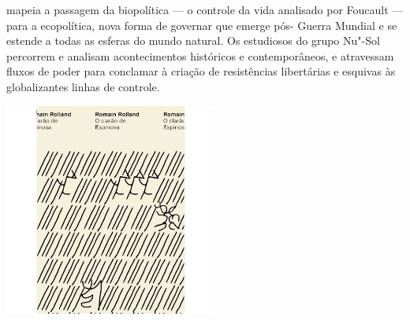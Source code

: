 \hspace*{-7cm}\hrulefill\hspace*{-7cm}

\medskip

 mapeia a passagem da biopolítica — o controle da vida analisado por Foucault — para a ecopolítica, nova forma de governar que emerge pós- Guerra Mundial e se estende a todas as esferas do mundo natural. Os estudiosos do grupo Nu"-Sol percorrem e analisam acontecimentos históricos e contemporâneos, e atravessam fluxos de poder para conclamar à criação de resistências libertárias e esquivas às globalizantes linhas de controle.

\vfill

\hspace*{-.4cm}\begin{minipage}[c]{1\linewidth}
\small{
{}}
\end{minipage}

\pagebreak

\hspace{.5cm}

\begin{center}
\hspace*{-.5cm}\includegraphics[width=70mm]{./grid/romain.jpeg}
\end{center}

